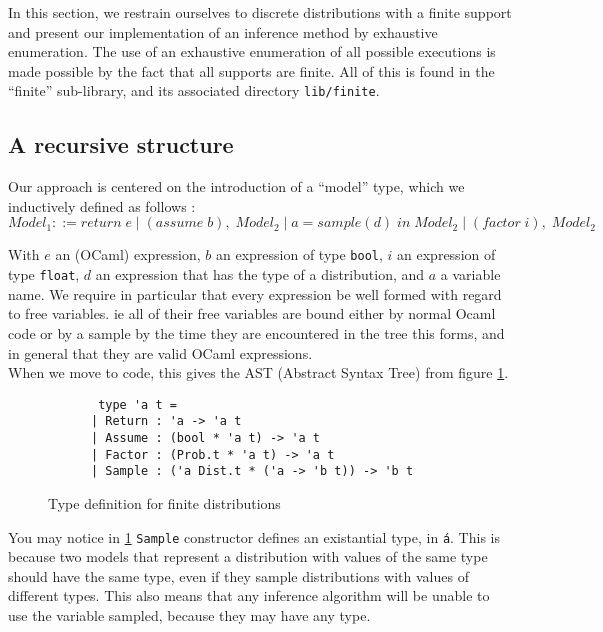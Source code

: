 \documentclass{article}
\begin{document}
In this section, we restrain ourselves to discrete distributions with a finite
support and present our implementation of an inference method by exhaustive
enumeration. The use of an exhaustive enumeration of all possible executions is
made possible by the fact that all supports are finite.
All of this is found in the ``finite'' sub-library, and its associated
directory \texttt{lib/finite}.

\subsection{A recursive structure}

Our approach is centered on the introduction of a ``model'' type, which we inductively defined as follows :
\begin{equation}
	Model_1 ::= return \; e \; | \; (assume \; b), \; Model_2 \; | \; a = sample(d) \; in \;Model_2 \; | \;  (factor \; i), \; Model_2
	\label{eq:1}
\end{equation}

With $e$ an (OCaml) expression, $b$ an expression of type \texttt{bool}, $i$ an
expression of type \texttt{float}, $d$ an expression that has the type of a
distribution, and $a$ a variable name. We require in particular that every
expression be well formed with regard to free variables. ie all of their
free variables are bound either by normal Ocaml code or by a sample by the time they are encountered in
the tree this forms, and in general that they are valid OCaml expressions. \\

When we move to code, this gives the AST (Abstract Syntax Tree) from figure \ref{fig:AST1}.
\begin{figure}[h]
	\centering
	\begin{verbatim}
       type 'a t =
	  | Return : 'a -> 'a t
	  | Assume : (bool * 'a t) -> 'a t
	  | Factor : (Prob.t * 'a t) -> 'a t
	  | Sample : ('a Dist.t * ('a -> 'b t)) -> 'b t
    	\end{verbatim}
	\caption{Type definition for finite distributions}
	\label{fig:AST1}
\end{figure}

You may notice in \ref{fig:AST1} \texttt{Sample} constructor defines an existantial type, in
\texttt{\'a}.
This is because two models that represent a distribution with values of the
same type should have the same type, even if they sample distributions with
values of different types. This also means that any inference algorithm will
be unable to use the variable sampled, because they may have any type.
\end{document}
